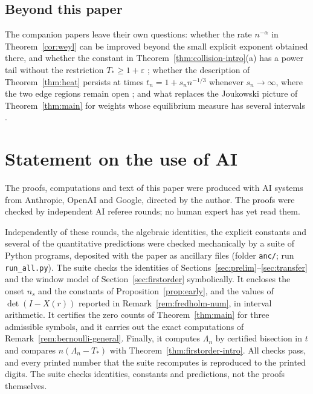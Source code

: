 \documentclass[11pt]{amsart}
\theoremstyle{definition}
\theoremstyle{remark}
\numberwithin{equation}{section}
\newcommand{\eps}{\varepsilon}
\begin{document}
\subsection{Beyond this paper}
The companion papers leave their own questions: whether the rate $n^{-\alpha}$ in Theorem~\ref{cor:weyl} can be improved beyond the small explicit exponent obtained there, and whether the constant in Theorem~\ref{thm:collision-intro}(a) has a power tail without the restriction $T_*\ge1+\eps$ \cite{CompA}; whether the description of Theorem~\ref{thm:heat} persists at times $t_n=1+s_nn^{-1/3}$ whenever $s_n\to\infty$, where the two edge regions remain open \cite{CompB}; and what replaces the Joukowski picture of Theorem~\ref{thm:main} for weights whose equilibrium measure has several intervals \cite{CompC}.

\raggedbottom
\section*{Statement on the use of AI}
The proofs, computations and text of this paper were produced with AI systems from Anthropic, OpenAI and Google, directed by the author. The proofs were checked by independent AI referee rounds; no human expert has yet read them.

Independently of these rounds, the algebraic identities, the explicit constants and several of the quantitative predictions were checked mechanically by a suite of Python programs, deposited with the paper as ancillary files (folder \texttt{anc/}; run \texttt{run\_all.py}). The suite checks the identities of Sections~\ref{sec:prelim}--\ref{sec:transfer} and the window model of Section~\ref{sec:firstorder} symbolically. It encloses the onset $n_s$ and the constants of Proposition~\ref{prop:early}, and the values of $\det(I-X(r))$ reported in Remark~\ref{rem:fredholm-num}, in interval arithmetic. It certifies the zero counts of Theorem~\ref{thm:main} for three admissible symbols, and it carries out the exact computations of Remark~\ref{rem:bernoulli-general}. Finally, it computes $\Lambda_n$ by certified bisection in $t$ and compares $n(\Lambda_n-T_*)$ with Theorem~\ref{thm:firstorder-intro}. All checks pass, and every printed number that the suite recomputes is reproduced to the printed digits. The suite checks identities, constants and predictions, not the proofs themselves.
\end{document}
